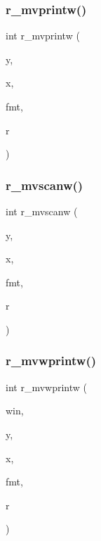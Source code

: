 \mbox{\label{C-macros_8c_ad0708b8c6acaba96f40a85f691012abf}} 
\subsubsection{\texorpdfstring{r\+\_\+mvprintw()}{r\_mvprintw()}}
{\footnotesize\ttfamily int r\+\_\+mvprintw (\begin{DoxyParamCaption}\item[{int}]{y,  }\item[{int}]{x,  }\item[{const char $\ast$}]{fmt,  }\item[{float}]{r }\end{DoxyParamCaption})}

\mbox{\label{C-macros_8c_a63197ac5eb05fa04cb88458e24ba8b98}} 
\subsubsection{\texorpdfstring{r\+\_\+mvscanw()}{r\_mvscanw()}}
{\footnotesize\ttfamily int r\+\_\+mvscanw (\begin{DoxyParamCaption}\item[{int}]{y,  }\item[{int}]{x,  }\item[{char $\ast$}]{fmt,  }\item[{float $\ast$}]{r }\end{DoxyParamCaption})}

\mbox{\label{C-macros_8c_aee7cd6844203dd1d2b386c1a42fb97bb}} 
\subsubsection{\texorpdfstring{r\+\_\+mvwprintw()}{r\_mvwprintw()}}
{\footnotesize\ttfamily int r\+\_\+mvwprintw (\begin{DoxyParamCaption}\item[{W\+I\+N\+D\+OW $\ast$}]{win,  }\item[{int}]{y,  }\item[{int}]{x,  }\item[{const char $\ast$}]{fmt,  }\item[{float}]{r }\end{DoxyParamCaption})}

